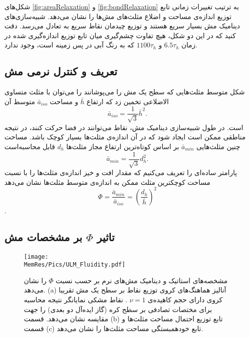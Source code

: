 شکل‌های 
\ref{fig:areaRelaxation}
و
\ref{fig:bondRelaxation}
به ترتیب تغییرات زمانی تابع توزیع اندازه‌ی مساحت و اضلاع مثلث‌های مش‌ها را نشان می‌دهد. شبیه‌سازی‌های دینامیک مش بسیار سریع هستند و توزیع چیدمان نقاط سریع به تعادل می‌رسد. دقت کنید که در این دو شکل، هیچ تفاوت چشم‌گیری میان تابع توزیع اندازه‌گیری شده در زمان
$6.5 \tau_h$
و
$1100 \tau_h$
که به رنگ آبی در پس زمینه است، وجود ندارد.

\subsection{\label{sec:phi}
تعریف و کنترل نرمی مش
}

شکل متوسط مثلث‌هایی که سطح یک مش را می‌پوشانند را می‌توان با مثلث متساوی الاضلاعی تخمین زد که ارتفاع 
$\bar h$
و مساحت 
$\bar a_{iso}$
متوسط آن
\begin{equation}
\bar a_{iso}=\frac{1}{\sqrt{3}}\bar h^2.
\label{eq:averageTriArea}
\end{equation}
است. در طول شبیه‌سازی دینامیک مش، نقاط می‌توانند در فضا حرکت کنند، در نتیجه مناطقی ممکن است ایجاد شود که در آن اندازه‌ی مثلث‌ها بسیار کوچک باشد. مساحت چنین مثلث‌هایی 
$\bar a_{min}$
بر اساس کوتاه‌ترین ارتفاع مجاز مثلث‌ها
$d_h$
قابل محاسبه‌است
\begin{equation}
\bar a_{min}=\frac{1}{\sqrt{3}}d_h^2.
\label{eq:aMin}
\end{equation}
پارامتر ساده‌ای را تعریف می‌کنیم که مقدار افت و خیز اندازه‌ی مثلث‌ها را با نسبت مساحت کوچکترین مثلث ممکن به اندازه‌ی متوسط مثلث‌ها نشان می‌دهد
\begin{equation}\label{eq:Phi}
\Phi=\frac{\bar a_{min}}{\bar a_{iso}}=\left(\frac{d_h}{\bar h}\right)^2
\end{equation}
.
\subsection{\label{sec:AreaVertex}
تاثیر
$\Phi$
بر مشخصات مش
}

\begin{figure}[ht]
\begin{center}
\texttt{[image: \\MemRes/Pics/ULM\_Fluidity.pdf]}
\caption{
مشخصه‌های استاتیک و دینامیک مش‌های نرم بر حسب نسبت
$\Phi$
را نشان می‌‌دهد.
(a)
آنالیز هماهنگ‌های کروی توزیع نقاط بر سطح یک مش تقریبا کروی دارای حجم کاهیده‌ی 
$\nu=1$
. نقاط مشکی نمایانگر نتیجه محاسبه برای مختصات تصادفی بر سطح کره (گاز ایده‌آل دو بعدی) را جهت مقایسه نشان می‌دهد. 
قسمت
(b)
تابع توزیع احتمال مساحت مثلث‌ها و قسمت
(c)
تابع خودهمبستگی مساحت مثلث‌ها را نشان می‌دهد.
}
\label{fig:vertexULM}
\end{center}
\end{figure}

